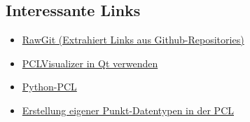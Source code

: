 \subsection{Interessante Links}\label{interessante-links}

\begin{itemize}
\itemsep1pt\parskip0pt
\item
  \href{http://rawgit.com}{RawGit (Extrahiert Links aus
  Github-Repositories)}
\item
  \href{http://stackoverflow.com/a/11939703/3281871}{PCLVisualizer in Qt
  verwenden}
\item
  \href{https://github.com/strawlab/python-pcl}{Python-PCL}
\item
  \href{pointclouds.org/documentation/tutorials/adding_custom_ptype.php}{Erstellung
  eigener Punkt-Datentypen in der PCL}
\end{itemize}
